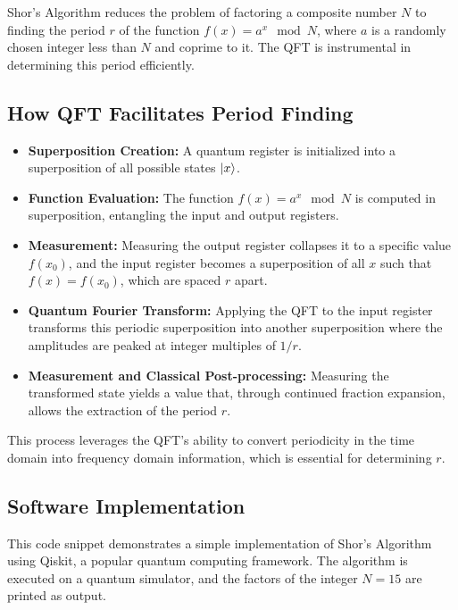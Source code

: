 \documentclass{article}
\begin{document}
Shor's Algorithm reduces the problem of factoring a composite number $N$ to finding the period $r$ of the function $f(x) = a^x \mod N$, where $a$ is a randomly chosen integer less than $N$ and coprime to it. The QFT is instrumental in determining this period efficiently.

\subsection{How QFT Facilitates Period Finding}

\begin{itemize}
    \item \textbf{Superposition Creation:} A quantum register is initialized into a superposition of all possible states $\ket{x}$.
    \item \textbf{Function Evaluation:} The function $f(x) = a^x \mod N$ is computed in superposition, entangling the input and output registers.
    \item \textbf{Measurement:} Measuring the output register collapses it to a specific value $f(x_0)$, and the input register becomes a superposition of all $x$ such that $f(x) = f(x_0)$, which are spaced $r$ apart.
    \item \textbf{Quantum Fourier Transform:} Applying the QFT to the input register transforms this periodic superposition into another superposition where the amplitudes are peaked at integer multiples of $1/r$.
    \item \textbf{Measurement and Classical Post-processing:} Measuring the transformed state yields a value that, through continued fraction expansion, allows the extraction of the period $r$.
\end{itemize}

This process leverages the QFT's ability to convert periodicity in the time domain into frequency domain information, which is essential for determining $r$.

\subsection{Software Implementation}



This code snippet demonstrates a simple implementation of Shor's Algorithm using Qiskit, a popular quantum computing framework. The algorithm is executed on a quantum simulator, and the factors of the integer \( N = 15 \) are printed as output.
\end{document}
